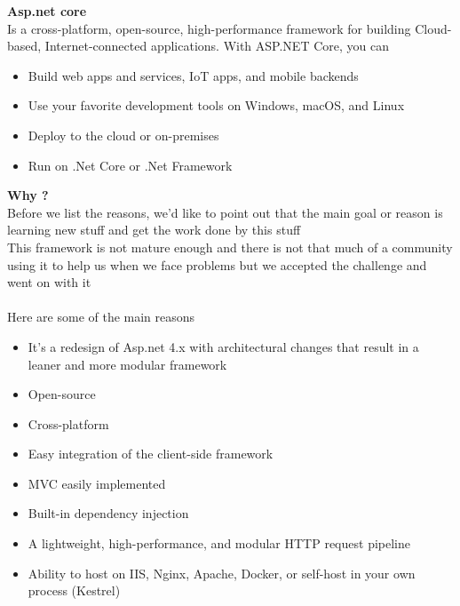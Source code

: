 \begin{adjustwidth}{2cm}{}
    \textbf{Asp.net core}\\
        Is a cross-platform, open-source, high-performance framework for building 
      Cloud-based, Internet-connected applications. With ASP.NET Core, you can
      \begin{itemize}
        \item Build web apps and services, IoT apps, and mobile backends
        \item Use your favorite development tools on Windows, macOS, and Linux
        \item Deploy to the cloud or on-premises
        \item Run on .Net Core or .Net Framework
      \end{itemize}
    \par\vspace {.5cm}
    \textbf{Why ?}\\
        Before we list the reasons, we’d like to point out that the main goal or reason
      is learning new stuff and get the work done by this stuff\\
      This framework is not mature enough and there is not that much of a community using it to help us when we face problems but we accepted the challenge and went on with it
      \\\\
      Here are some of the main reasons
      \begin{itemize}
        \item It’s a redesign of Asp.net 4.x with architectural changes that result in a leaner and more modular framework
        \item Open-source
        \item Cross-platform
        \item Easy integration of the client-side framework
        \item MVC easily implemented
        \item Built-in dependency injection
        \item A lightweight, high-performance, and modular HTTP request pipeline
        \item Ability to host on IIS, Nginx, Apache, Docker, or self-host in your own process (Kestrel)
      \end{itemize}

\end{adjustwidth}
